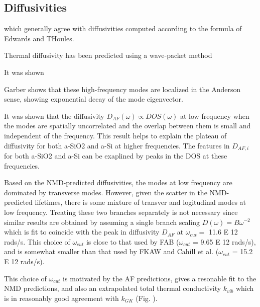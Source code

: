 \documentclass[aps,prb,twocolumn,superscriptaddress,footinbib,amsmath,amssymb,floatfix]{revtex4}
\begin{document}
\subsection{\label{S:Diffusivities}Diffusivities}

which generally agree with diffusivities computed according to the 
formula of Edwards and THoules.\cite{edwards_numerical_1972,
feldman_numerical_1999,beltukov_ioffe-regel_2013}

Thermal diffusivity has been predicted using a wave-packet method

It was shown 

Garber shows that these high-frequency modes are localized in the 
Anderson sense, showing exponential decay of the mode eigenvector.
\cite{garber_numerical_2001}

It was shown that the diffusivity $D_{AF}(\omega) \propto DOS(\omega)$ 
at low frequency when the modes are spatially uncorrelated and the 
overlap between them is small and independent of the frequency.
\cite{vitelli_heat_2010,xu_energy_2009} This result helps to explain 
the plateau of diffusivity for both a-SiO2 and a-Si at higher 
frequencies. The features in $D_{AF,i}$ for both a-SiO2 and a-Si can 
be exaplined by peaks in the DOS at these frequencies. 




Based on the NMD-predicted diffusivities, the modes at low frequency are 
dominated by transverse modes. However, given the scatter in the 
NMD-predicted lifetimes, there is some mixture of transver and logitudinal 
modes at low frequency.  Treating these two branches separately 
is not necessary since similar results are obtained by assuming a single 
branch scaling $D(\omega)=B\omega^{-2}$ which is fit to coincide with the 
peak in diffusivity $D_{AF}$ at $\omega_{cut} = $ 11.6 E 12 rads/s. This 
choice of $\omega_{cut}$ is close to that used by 
FAB ($\omega_{cut}$ = 9.65 E 12 rads/s),\cite{feldman_thermal_1993} 
and is somewhat smaller than 
that used by FKAW\cite{feldman_numerical_1999} 
and Cahill et al.\cite{cahill_thermal_1994} 
($\omega_{cut}$ = 15.2 E 12 rads/s). 

This 
choice of $\omega_{cut}$ is motivated by the AF predictions, gives a 
resonable fit to the NMD predictions, and also an extrapolated total 
thermal conductivity $k_{vib}$ which is in reasonably good agreement 
with $k_{GK}$ (Fig. ).  
\end{document}
